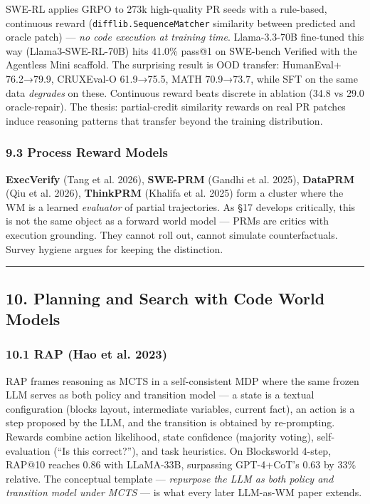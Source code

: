 \documentclass{article}
\begin{document}
SWE-RL applies GRPO to 273k high-quality PR seeds with a rule-based,
continuous reward (\texttt{difflib.SequenceMatcher} similarity between
predicted and oracle patch) --- \emph{no code execution at training
time}. Llama-3.3-70B fine-tuned this way (Llama3-SWE-RL-70B) hits 41.0\%
pass@1 on SWE-bench Verified with the Agentless Mini scaffold. The
surprising result is OOD transfer: HumanEval+ 76.2→79.9, CRUXEval-O
61.9→75.5, MATH 70.9→73.7, while SFT on the same data \emph{degrades} on
these. Continuous reward beats discrete in ablation (34.8 vs 29.0
oracle-repair). The thesis: partial-credit similarity rewards on real PR
patches induce reasoning patterns that transfer beyond the training
distribution.

\hypertarget{process-reward-models}{%
\subsubsection{9.3 Process Reward Models}\label{process-reward-models}}

\textbf{ExecVerify} (Tang et al. 2026), \textbf{SWE-PRM} (Gandhi et al.
2025), \textbf{DataPRM} (Qiu et al. 2026), \textbf{ThinkPRM} (Khalifa et
al. 2025) form a cluster where the WM is a learned \emph{evaluator} of
partial trajectories. As §17 develops critically, this is not the same
object as a forward world model --- PRMs are critics with execution
grounding. They cannot roll out, cannot simulate counterfactuals. Survey
hygiene argues for keeping the distinction.

\begin{center}\rule{0.5\linewidth}{0.5pt}\end{center}

\hypertarget{planning-and-search-with-code-world-models}{%
\subsection{10. Planning and Search with Code World
Models}\label{planning-and-search-with-code-world-models}}

\hypertarget{rap-arxiv2305_14992}{%
\subsubsection{10.1 RAP (Hao et al. 2023)}\label{rap-arxiv2305_14992}}

RAP frames reasoning as MCTS in a self-consistent MDP where the same
frozen LLM serves as both policy and transition model --- a state is a
textual configuration (blocks layout, intermediate variables, current
fact), an action is a step proposed by the LLM, and the transition is
obtained by re-prompting. Rewards combine action likelihood, state
confidence (majority voting), self-evaluation (``Is this correct?''),
and task heuristics. On Blocksworld 4-step, RAP@10 reaches 0.86 with
LLaMA-33B, surpassing GPT-4+CoT's 0.63 by 33\% relative. The conceptual
template --- \emph{repurpose the LLM as both policy and transition model
under MCTS} --- is what every later LLM-as-WM paper extends.
\end{document}
